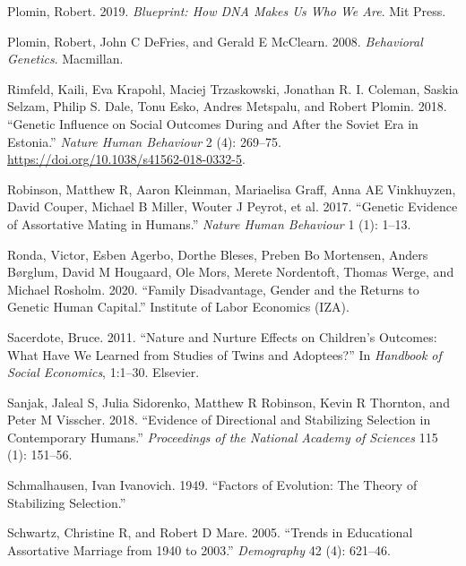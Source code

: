 \documentclass[
]{article}
\newlength{\cslhangindent}
\newlength{\cslentryspacingunit} %
\newenvironment{CSLReferences}[2] %
 {%
  \setlength{\parindent}{0pt}
  \ifodd #1
  \let\oldpar\par
  \def\par{\hangindent=\cslhangindent\oldpar}
  \fi
  \setlength{\parskip}{#2\cslentryspacingunit}
 }%
 {}
\theoremstyle{definition}
\theoremstyle{definition}
\theoremstyle{definition}
\theoremstyle{definition}
\theoremstyle{remark}
\begin{document}
\begin{CSLReferences}{1}{0}
\leavevmode{}%
Plomin, Robert. 2019. \emph{Blueprint: How DNA Makes Us Who We Are}. Mit Press.

\leavevmode{}%
Plomin, Robert, John C DeFries, and Gerald E McClearn. 2008. \emph{Behavioral Genetics}. Macmillan.

\leavevmode{}%
Rimfeld, Kaili, Eva Krapohl, Maciej Trzaskowski, Jonathan R. I. Coleman, Saskia Selzam, Philip S. Dale, Tonu Esko, Andres Metspalu, and Robert Plomin. 2018. {``Genetic Influence on Social Outcomes During and After the Soviet Era in Estonia.''} \emph{Nature Human Behaviour} 2 (4): 269--75. \url{https://doi.org/10.1038/s41562-018-0332-5}.

\leavevmode{}%
Robinson, Matthew R, Aaron Kleinman, Mariaelisa Graff, Anna AE Vinkhuyzen, David Couper, Michael B Miller, Wouter J Peyrot, et al. 2017. {``Genetic Evidence of Assortative Mating in Humans.''} \emph{Nature Human Behaviour} 1 (1): 1--13.

\leavevmode{}%
Ronda, Victor, Esben Agerbo, Dorthe Bleses, Preben Bo Mortensen, Anders Børglum, David M Hougaard, Ole Mors, Merete Nordentoft, Thomas Werge, and Michael Rosholm. 2020. {``Family Disadvantage, Gender and the Returns to Genetic Human Capital.''} Institute of Labor Economics (IZA).

\leavevmode{}%
Sacerdote, Bruce. 2011. {``Nature and Nurture Effects on Children's Outcomes: What Have We Learned from Studies of Twins and Adoptees?''} In \emph{Handbook of Social Economics}, 1:1--30. Elsevier.

\leavevmode{}%
Sanjak, Jaleal S, Julia Sidorenko, Matthew R Robinson, Kevin R Thornton, and Peter M Visscher. 2018. {``Evidence of Directional and Stabilizing Selection in Contemporary Humans.''} \emph{Proceedings of the National Academy of Sciences} 115 (1): 151--56.

\leavevmode{}%
Schmalhausen, Ivan Ivanovich. 1949. {``Factors of Evolution: The Theory of Stabilizing Selection.''}

\leavevmode{}%
Schwartz, Christine R, and Robert D Mare. 2005. {``Trends in Educational Assortative Marriage from 1940 to 2003.''} \emph{Demography} 42 (4): 621--46.


\end{CSLReferences}
\end{document}
